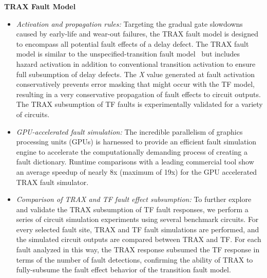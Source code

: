 \textbf{TRAX Fault Model}
\begin{itemize}
\item{\textit{Activation and propagation rules:} Targeting the gradual gate slowdowns caused by early-life and wear-out failures, the TRAX fault model is designed to encompass all potential fault effects of a delay defect.
%
The TRAX fault model is similar to the unspecified-transition fault model~\cite{pomeranz08} but includes hazard activation in addition to conventional transition activation to ensure full subsumption of delay defects.
%
The \textit{X} value generated at fault activation conservatively prevents error masking that might occur with the TF model, resulting in a very conservative propagation of fault effects to circuit outputs.
%
The TRAX subsumption of TF faults is experimentally validated for a variety of circuits.}
\item{\textit{GPU-accelerated fault simulation:} The incredible parallelism of graphics processing units (GPUs) is harnessed to provide an efficient fault simulation engine to accelerate the computationally demanding process of creating a fault dictionary.
%
Runtime comparisons with a leading commercial tool show an average speedup of nearly 8x (maximum of 19x) for the GPU accelerated TRAX fault simulator.}
\item{\textit{Comparison of TRAX and TF fault effect subsumption:} To further explore and validate the TRAX subsumption of TF fault responses, we perform a series of circuit simulation experiments using several benchmark circuits.
%
For every selected fault site, TRAX and TF fault simulations are performed, and the simulated circuit outputs are compared between TRAX and TF.
%
For each fault analyzed in this way, the TRAX response subsumed the TF response in terms of the number of fault detections, confirming the ability of TRAX to fully-subsume the fault effect behavior of the transition fault model.}
\end{itemize}

